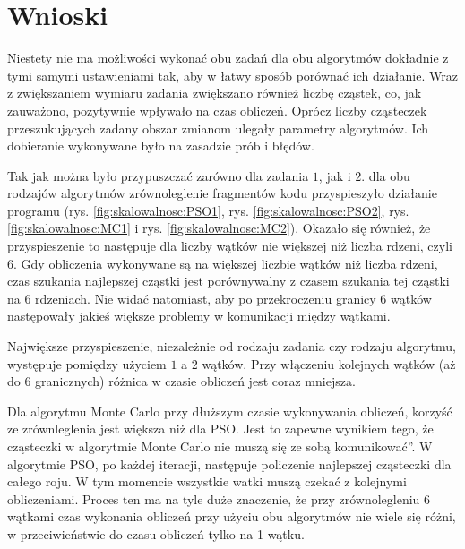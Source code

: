 \documentclass[11pt, a4paper, oneside]{article}
\begin{document}
\section{Wnioski} 

Niestety nie ma możliwości wykonać obu zadań dla obu algorytmów dokładnie z tymi samymi ustawieniami tak, aby w łatwy sposób porównać ich działanie. Wraz z zwiększaniem wymiaru zadania zwiększano również liczbę cząstek, co, jak zauważono, pozytywnie wpływało na czas obliczeń. Oprócz liczby cząsteczek przeszukujących zadany obszar zmianom ulegały parametry algorytmów. Ich dobieranie wykonywane było na zasadzie prób i błędów.

Tak jak można było przypuszczać zarówno dla zadania $1$, jak i $2$. dla obu rodzajów algorytmów zrównoleglenie fragmentów kodu przyspieszyło działanie programu (rys. \ref{fig:skalowalnosc:PSO1}, rys. \ref{fig:skalowalnosc:PSO2}, rys. \ref{fig:skalowalnosc:MC1} i rys. \ref{fig:skalowalnosc:MC2}). Okazało się również, że przyspieszenie to następuje dla liczby wątków nie większej niż liczba rdzeni, czyli $6$. Gdy obliczenia wykonywane są na większej liczbie wątków niż liczba rdzeni, czas szukania najlepszej cząstki jest porównywalny z czasem szukania tej cząstki na $6$ rdzeniach. Nie widać natomiast, aby po przekroczeniu granicy $6$ wątków następowały jakieś większe problemy w komunikacji między wątkami.

Największe przyspieszenie, niezależnie od rodzaju zadania czy rodzaju algorytmu, występuje pomiędzy użyciem $1$ a $2$ wątków. Przy włączeniu kolejnych wątków (aż do $6$ granicznych) różnica w czasie obliczeń jest coraz mniejsza.

Dla algorytmu Monte Carlo przy dłuższym czasie wykonywania obliczeń, korzyść ze zrównleglenia jest większa niż dla PSO. Jest to zapewne wynikiem tego, że cząsteczki w algorytmie Monte Carlo nie muszą się ze sobą \quotedblbase komunikować\textquotedblright. W algorytmie PSO, po każdej iteracji, następuje policzenie najlepszej cząsteczki dla całego roju. W tym momencie wszystkie watki muszą czekać z kolejnymi obliczeniami. Proces ten ma na tyle duże znaczenie, że przy zrównolegleniu 6 wątkami czas wykonania obliczeń przy użyciu obu algorytmów nie wiele się różni, w przeciwieństwie do czasu obliczeń tylko na 1 wątku.

{}

\end{document}
